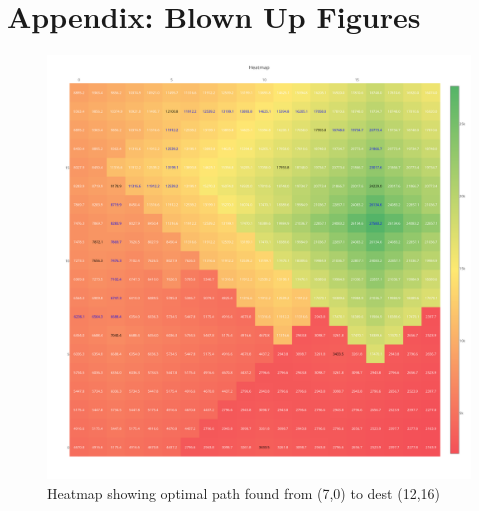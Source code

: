 \documentclass[10pt,twocolumn,letterpaper]{article}
\begin{document}
\section{Appendix: Blown Up Figures}
\begin{figure}[h]
\begin{center}
\includegraphics[scale=0.40]{x7y0}
\end{center}
   \caption{Heatmap showing optimal path found from (7,0) to dest (12,16)}
\label{fig:long}
\label{fig:onecol}
\end{figure}


\end{document}
